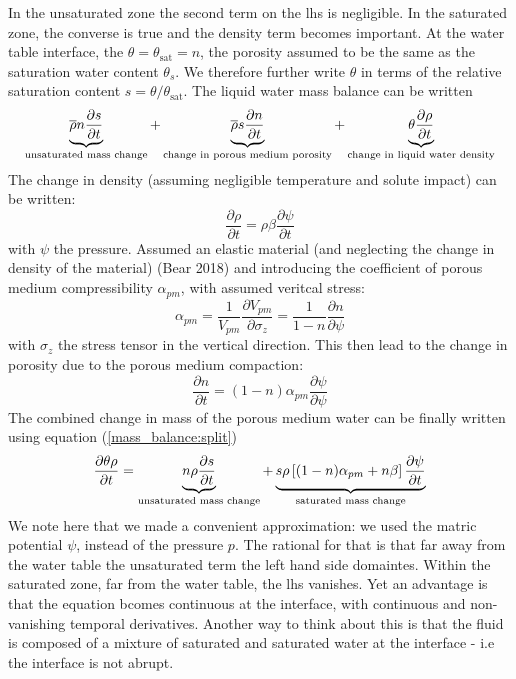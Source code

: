 \documentclass{report}
\begin{document}
In the unsaturated zone the second term on the lhs is negligible. In the saturated zone, the converse is true and the density term becomes important. At the water table interface, the $\theta=\theta_{\mathrm{sat}}=n$, the porosity assumed to be the same as the saturation water content $\theta_{s}$. We therefore further write $\theta$ in terms of the relative saturation content $s=\theta/\theta_{\mathrm{sat}}$.
The liquid water mass balance can be written
\begin{equation}
\underbrace{{\overline \rho} n \frac{\partial s}{\partial t} }_\text{\rm unsaturated mass change} + \underbrace{{\overline \rho} s \frac{\partial n}{\partial t}  }_\text{\rm change in porous medium porosity}  
+ 
\underbrace{\theta \frac{\partial \rho}{\partial t}   }_\text{\rm change in liquid water density}  
\label{mass_balance:split}
\end{equation}
The change in density (assuming negligible temperature and solute impact) can be written:
\begin{equation}
\frac{\partial \rho}{\partial t} = \rho \beta \frac{\partial \psi}{\partial t}
\end{equation}
with $\psi$ the pressure.
Assumed an elastic material (and neglecting the change in density of the material) (Bear 2018) and introducing the coefficient of porous medium compressibility $\alpha_{pm}$, with assumed veritcal stress:
\begin{equation}
\alpha_{pm}=\frac{1}{V_{pm}} \frac{\partial V_{pm}}{\partial \sigma_z} = \frac{1}{1-n} \frac{\partial n}{\partial \psi}
\end{equation}
with $\sigma_z$ the stress tensor in the vertical direction.
This then lead to the change in porosity due to the porous medium compaction:
\begin{equation}
\frac{\partial n}{\partial t} = (1-n)\alpha_{pm}\frac{\partial \psi}{ \partial \psi}
\end{equation}
The combined change in mass of the porous medium water can be finally written using equation (\ref{mass_balance:split}) 
\begin{equation}
\frac{\partial \theta \rho}{\partial t} = 
\underbrace{n \rho \frac{\partial s}{ \partial t} }_\text{\rm unsaturated mass change} + \underbrace{s \rho \left[  (1-n)\alpha_{pm} + n\beta \right] \frac{\partial \psi}{\partial t} }_\text{\rm saturated mass change}
\end{equation}
We note here that we made a convenient approximation: we used the matric potential $\psi$, instead of the pressure $p$. The rational for that is that far away from the water table the unsaturated term the left hand side domaintes. Within the saturated zone, far from the water table, the lhs vanishes. Yet an advantage is that the equation bcomes continuous at the interface, with continuous and non-vanishing temporal derivatives. Another way to think about this is that the fluid is composed of a mixture of saturated and saturated water at the interface - i.e the interface is not abrupt. 
\end{document}
